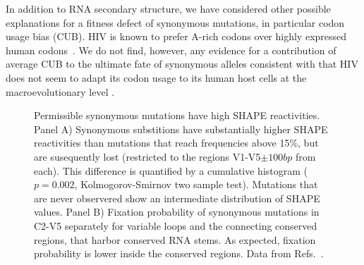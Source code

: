 \documentclass[rmp, twocolumn]{revtex4}
\begin{document}
In addition to RNA secondary structure, we have considered other possible
explanations for a fitness defect of synonymous mutations, in particular codon
usage bias (CUB). HIV is known to prefer A-rich codons over highly expressed
human codons~\citep{jenkins_extent_2003,kuyl_biased_2012}. We do not find,
however, any evidence for a contribution of average CUB to the ultimate fate of
synonymous alleles consistent with that HIV does not seem to adapt its codon
usage to its human host cells at the macroevolutionary level
\citep{kuyl_biased_2012}.


\begin{figure}
\begin{center}
\caption{Permissible synonymous mutations have
high SHAPE reactivities.
Panel A) Synonymous substitions have
substantially higher SHAPE reactivities than mutations that reach frequencies above 15\%, but are
susequently lost (restricted to the regions V1-V5$\pm 100bp$ from each). This difference
is quantified by a cumulative histogram ($p=0.002$, Kolmogorov-Smirnov two 
sample test). Mutations that are never
observered show an intermediate distribution of SHAPE values.
Panel B) Fixation probability of synonymous mutations in C2-V5
separately for variable loops and the connecting conserved regions, that
harbor conserved RNA stems. As expected, fixation probability is lower inside
the conserved regions. Data from Refs.~\cite{shankarappa_consistent_1999,
bunnik_autologous_2008, liu_selection_2006}.}
\label{fig:SHAPE}
\end{center}
\end{figure}
\end{document}
